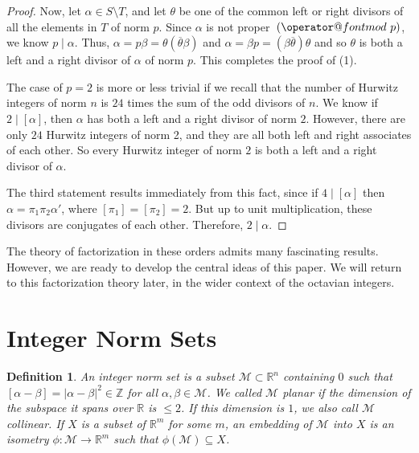 \documentclass[10pt]{amsart}
\makeatletter
\newcommand{\M}{\mathcal{M}}
\newcommand{\Z}{\mathbb{Z}}
\newcommand{\R}{\mathbb{R}}
\renewcommand{\bar}{\overline}
\newcommand{\norm}[1]{\left[#1\right]}
\newtheorem{defn}[thm]{Definition}
\DeclareRobustCommand{\pmod}{\@pmods}
\def\@pmods#1{\mkern4mu({\operator@font mod}\mkern 6mu#1)}
\makeatother
\begin{document}
\begin{proof}
Now, let $\alpha \in S \setminus T$, and let $\theta$ be one of the common left or right divisors of all the elements in $T$ of norm $p$.  Since $\alpha$ is not proper $\pmod{p}$, we know $p \mid \alpha$.  Thus, $\alpha = p\beta = \theta(\bar{\theta} \beta)$ and $\alpha = \beta p = (\beta\bar{\theta})\theta$ and so $\theta$ is both a left and a right divisor of $\alpha$ of norm $p$.  This completes the proof of (1).

The case of $p=2$ is more or less trivial if we recall that the number of Hurwitz integers of norm $n$ is $24$ times the sum of the odd divisors of $n$.  We know if $2 \mid \norm{\alpha}$, then $\alpha$ has both a left and a right divisor of norm $2$.  However, there are only $24$ Hurwitz integers of norm 2, and they are all both left and right associates of each other.  So every Hurwitz integer of norm $2$ is both a left and a right divisor of $\alpha$.

The third statement results immediately from this fact, since if $4 \mid \norm{\alpha}$ then $\alpha = \pi_1\pi_2 \alpha'$, where $\norm{\pi_1} = \norm{\pi_2} = 2$.  But up to unit multiplication, these divisors are conjugates of each other.  Therefore, $2 \mid \alpha$.
\end{proof}

The theory of factorization in these orders admits many fascinating results.  However, we are ready to develop the central ideas of this paper.  We will return to this factorization theory later, in the wider context of the octavian integers.




\section{Integer Norm Sets}

\begin{defn}
\normalfont
An \emph{integer norm set} is a subset $\M \subset \R^n$ containing $0$ such that $\norm{\alpha - \beta} = |\alpha - \beta|^2 \in \Z$ for all $\alpha, \beta \in \M$.  We called $\M$ \emph{planar} if the dimension of the subspace it spans over $\R$ is $\leq 2$.  If this dimension is $1$, we also call $\M$ \emph{collinear}.  If $X$ is a subset of $\R^m$ for some $m$, an \emph{embedding} of $\M$ into $X$ is an isometry $\phi : \M \rightarrow \R^m$ such that $\phi(\M) \subseteq X$.
\end{defn}
\end{document}
